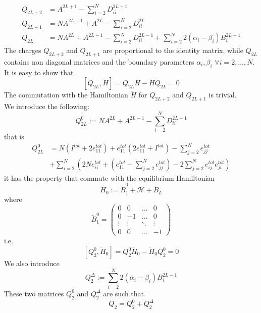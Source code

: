\documentclass[11pt]{article}
\numberwithin{equation}{section}
\numberwithin{equation}{subsection}
\begin{document}
\begin{align}
	Q_{2L+2}&=A^{2L+1}-\sum_{i=2}^{N}D_{ii}^{2L+1}\\
	Q_{2L+1}&=NA^{2L+1}+A^{2L}-\sum_{i=2}^{N}D_{ii}^{2L}\\
	Q_{2L\phantom{+}}&=NA^{2L}+A^{2L-1}-\sum_{i=2}^{N}D_{ii}^{2L-1}+\sum_{i=2}^{N}2(\alpha_{i}-\beta_{i})B_{i}^{2L-1}
\end{align}
The charges $Q_{2L+2}$ and $Q_{2L+1}$ are proportional to the identity matrix, while $Q_{2L}$ contains non diagonal matrices and the boundary parameters $\alpha_{i},\beta_{i}$ $\forall i=2,\ldots,N$.\\
It is easy to show that 
\begin{equation}
	\left[Q_{2L},\widetilde{H}\right]=Q_{2L}\widetilde{H}-\widetilde{H}Q_{2L}=0
\end{equation}
The commutation with the Hamiltonian $\widetilde{H}$ for $Q_{2L+2}$ and $Q_{2L+1}$ is trivial. \\
We introduce the following:
\begin{equation}
Q_{2L}^{0}:=NA^{2L}+A^{2L-1}-\sum_{i=2}^{N}D_{ii}^{2L-1}
\end{equation}
that is 
\begin{equation}
\begin{split}
Q_{2L}^{0}&=N\left(I^{tot}+2e_{11}^{tot}\right)+e_{11}^{tot}(2e_{11}^{tot}+I^{tot})-\sum_{j=2}^{N}e_{jj}^{tot}
\\&
+\sum_{i=2}^{N}\left(	2Ne_{ii}^{tot}+\left(e_{11}^{tot}-\sum_{j=2}^{N}e_{jj}^{tot}\right)-2\sum_{j=2}^{N}e_{ij}^{tot}e_{ji}^{tot}\right)
\end{split}
\end{equation}
it has the property that commute with the equilibrium Hamiltonian
\begin{equation}
\widetilde{H}_{0}:=\widetilde{B}_{1}^{0}+\mathcal{H}+\widetilde{B}_{L}
\end{equation}
where 
\begin{equation}
\widetilde{B}_{1}^{0}=\begin{pmatrix}
0&0&\ldots&0\\
0&-1&\ldots&0\\
\vdots&\vdots&\ddots&\vdots\\
0&0&\ldots&-1
\end{pmatrix}
\end{equation}
i.e.
\begin{equation}
\left[Q_{2}^{0},\widetilde{H}_{0}\right]=Q_{2}^{0}\widetilde{H}_{0}-\widetilde{H}_{0}Q_{2}^{0}=0
\end{equation}
We also introduce 
\begin{equation}
Q_{2}^{\Delta}:=\sum_{i=2}^{N}2(\alpha_{i}-\beta_{i})B_{i}^{2L-1}
\end{equation}
These two matrices $Q_{2}^{0}$ and $Q_{2}^{\Delta}$ are such that
\begin{equation}
Q_{2}=Q_{2}^{0}+Q_{2}^{\Delta}
\end{equation}
\end{document}
